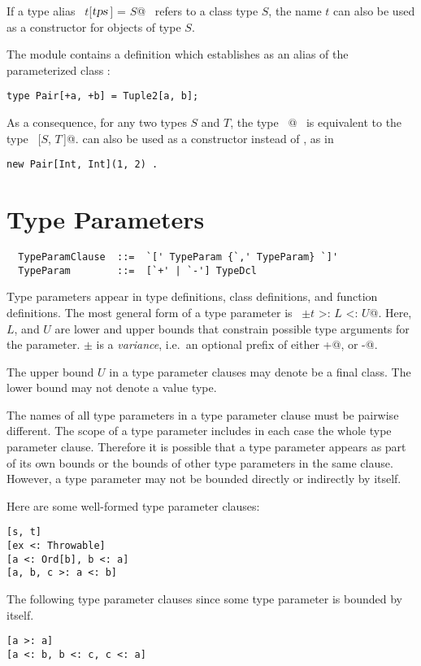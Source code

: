 \documentclass[a4paper,12pt,twoside,titlepage]{book}
\newcommand{\tps}{\mbox{\sl tps}}
\begin{document}
If a type alias ~\lstinline@type $t$[$\tps\,$] = $S$@~ refers to a class type
$S$, the name $t$ can also be used as a constructor for
objects of type $S$.

\example The  module contains a definition which establishes  
as an alias of the parameterized class :
\begin{lstlisting}
type Pair[+a, +b] = Tuple2[a, b];
\end{lstlisting}
As a consequence, for any two types $S$ and $T$, the type
~\lstinline@Pair[$S$, $T\,$]@~ is equivalent to the type ~[$S$, $T\,$]@.
 can also be used as a constructor instead of , as in
\begin{lstlisting}
new Pair[Int, Int](1, 2) .
\end{lstlisting}

\section{Type Parameters}

\syntax\begin{lstlisting}
  TypeParamClause  ::=  `[' TypeParam {`,' TypeParam} `]'
  TypeParam        ::=  [`+' | `-'] TypeDcl
\end{lstlisting}


Type parameters appear in type definitions, class definitions, and
function definitions.  The most general form of a type parameter is
~\lstinline@$\pm t$ >: $L$ <: $U$@.  Here, $L$, and $U$ are lower
and upper bounds that constrain possible type arguments for the
parameter. $\pm$ is a {\em variance}, i.e.\ an optional prefix 
of either \lstinline@+@, or \lstinline@-@.

The upper bound $U$ in a type parameter clauses may denote be a final
class. The lower bound may not denote a value type.

The names of all type parameters in a type parameter clause must be
pairwise different.  The scope of a type parameter includes in each
case the whole type parameter clause. Therefore it is possible that a
type parameter appears as part of its own bounds or the bounds of
other type parameters in the same clause.  However, a type parameter
may not be bounded directly or indirectly by itself.

\example Here are some well-formed type parameter clauses:
\begin{lstlisting}
[s, t]
[ex <: Throwable]
[a <: Ord[b], b <: a]
[a, b, c >: a <: b]
\end{lstlisting}
The following type parameter clauses since some type parameter is bounded by itself.
\begin{lstlisting}
[a >: a]                 
[a <: b, b <: c, c <: a]
\end{lstlisting}
\end{document}
